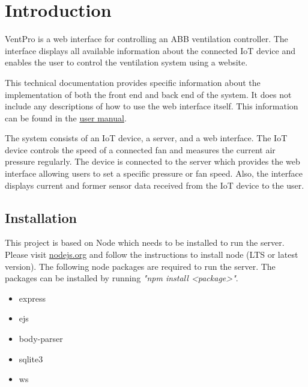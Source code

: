 
\chapter{Introduction}
\label{ch:introduction}

VentPro is a web interface for controlling an ABB ventilation controller. The interface displays all available information about the connected IoT device and enables the user to control the ventilation system using a website. 

This technical documentation provides specific information about the implementation of both the front end and back end of the system. It does not include any descriptions of how to use the web interface itself. This information can be found in the  \href{https://github.com/sischae/Internet_of_Things_Project/blob/main/doc/user_manual/user_manual.pdf}{user manual}.

The system consists of an IoT device, a server, and a web interface. The IoT device controls the speed of a connected fan and measures the current air pressure regularly. The device is connected to the server which provides the web interface allowing users to set a specific pressure or fan speed. Also, the interface displays current and former sensor data received from the IoT device to the user.





\section{Installation}
\label{sec:installation}

This project is based on Node which needs to be installed to run the server. Please visit \href{https://nodejs.org}{nodejs.org} and follow the instructions to install node (LTS or latest version). The following node packages are required to run the server. The packages can be installed by running \textit{"npm install <package>"}.

\begin{itemize}
	\item express
    \item ejs
    \item body-parser
    \item sqlite3
    \item ws
\end{itemize}

